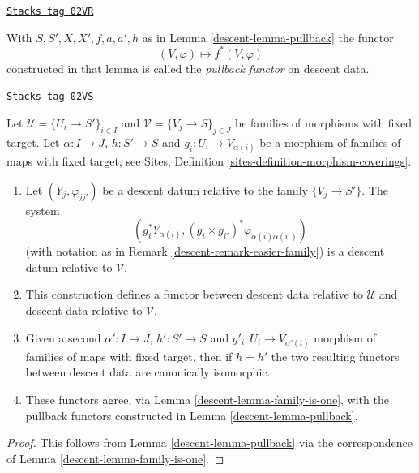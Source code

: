 \begin{definition}
\label{descent-definition-pullback-functor}
\href{https://stacks.math.columbia.edu/tag/02VR}{\texttt{Stacks tag 02VR}}

With $S, S', X, X', f, a, a', h$ as in Lemma \ref{descent-lemma-pullback} the functor
$$
(V, \varphi) \longmapsto f^*(V, \varphi)
$$
constructed in that lemma is called the {\it pullback functor} on descent data.
\end{definition}

\begin{lemma}

\label{descent-lemma-pullback-family}
\href{https://stacks.math.columbia.edu/tag/02VS}{\texttt{Stacks tag 02VS}}

Let $\mathcal{U} = \{U_i \to S'\}_{i \in I}$ and
$\mathcal{V} = \{V_j \to S\}_{j \in J}$ be families of morphisms with
fixed target. Let $\alpha : I \to J$, $h : S' \to S$ and
$g_i : U_i \to V_{\alpha(i)}$ be a morphism of families
of maps with fixed target, see
Sites, Definition \ref{sites-definition-morphism-coverings}.
\begin{enumerate}
\item Let $(Y_j, \varphi_{jj'})$ be a descent datum relative to the
family $\{V_j \to S'\}$. The system
$$
\left(
g_i^*Y_{\alpha(i)},
(g_i \times g_{i'})^*\varphi_{\alpha(i)\alpha(i')}
\right)
$$
(with notation as in Remark \ref{descent-remark-easier-family})
is a descent datum relative to $\mathcal{V}$.
\item This construction defines a functor between descent data relative
to $\mathcal{U}$ and descent data relative to $\mathcal{V}$.
\item Given a second $\alpha' : I \to J$, $h' : S' \to S$ and
$g'_i : U_i \to V_{\alpha'(i)}$ morphism of families
of maps with fixed target, then if $h = h'$ the two resulting functors
between descent data are canonically isomorphic.
\item These functors agree, via Lemma \ref{descent-lemma-family-is-one},
with the pullback functors constructed in Lemma \ref{descent-lemma-pullback}.
\end{enumerate}
\end{lemma}

\begin{proof}

This follows from Lemma \ref{descent-lemma-pullback} via the
correspondence of Lemma \ref{descent-lemma-family-is-one}.
\end{proof}

